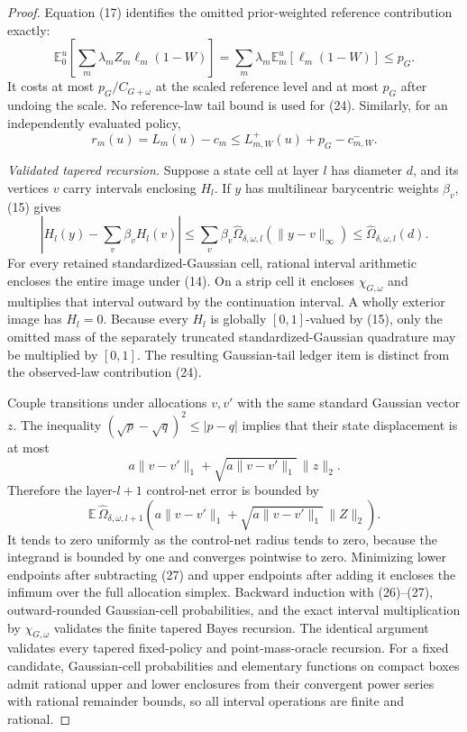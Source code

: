 \documentclass{article}
\begin{document}
\begin{proof}
Equation (17) identifies the omitted prior-weighted reference contribution exactly:
\[
 \mathbb E_0^u\!\left[
 \sum_m\lambda_mZ_m\ell_m(1-W)\right]
 =\sum_m\lambda_m\mathbb E_m^u[\ell_m(1-W)]\leq p_G.
 \tag{24}
\]
It costs at most \(p_G/C_{G+\omega}\) at the scaled reference level and at most \(p_G\) after undoing the scale.  No reference-law tail bound is used for (24).  Similarly, for an independently evaluated policy,
\[
 r_m(u)=L_m(u)-c_m
 \leq L_{m,W}^+(u)+p_G-c_{m,W}^-.
 \tag{25}
\]

\emph{Validated tapered recursion.}
Suppose a state cell at layer \(l\) has diameter \(d\), and its vertices \(v\) carry intervals enclosing \(H_l\).  If \(y\) has multilinear barycentric weights \(\beta_v\), (15) gives
\[
 \left|H_l(y)-\sum_v\beta_vH_l(v)\right|
 \leq\sum_v\beta_v\widehat\Omega_{\delta,\omega,l}(\|y-v\|_\infty)
 \leq\widehat\Omega_{\delta,\omega,l}(d).
 \tag{26}
\]
For every retained standardized-Gaussian cell, rational interval arithmetic encloses the entire image under (14).  On a strip cell it encloses \(\chi_{G,\omega}\) and multiplies that interval outward by the continuation interval.  A wholly exterior image has \(H_l=0\).  Because every \(H_l\) is globally \([0,1]\)-valued by (15), only the omitted mass of the separately truncated standardized-Gaussian quadrature may be multiplied by \([0,1]\).  The resulting Gaussian-tail ledger item is distinct from the observed-law contribution (24).

Couple transitions under allocations \(v,v'\) with the same standard Gaussian vector \(z\).  The inequality \((\sqrt p-\sqrt q)^2\leq|p-q|\) implies that their state displacement is at most
\[
 a\|v-v'\|_1+\sqrt{a\|v-v'\|_1}\,\|z\|_2.
\]
Therefore the layer-\(l+1\) control-net error is bounded by
\[
 \mathbb E\,\widehat\Omega_{\delta,\omega,l+1}\!\left(
 a\|v-v'\|_1+\sqrt{a\|v-v'\|_1}\,\|Z\|_2\right).
 \tag{27}
\]
It tends to zero uniformly as the control-net radius tends to zero, because the integrand is bounded by one and converges pointwise to zero.  Minimizing lower endpoints after subtracting (27) and upper endpoints after adding it encloses the infimum over the full allocation simplex.  Backward induction with (26)--(27), outward-rounded Gaussian-cell probabilities, and the exact interval multiplication by \(\chi_{G,\omega}\) validates the finite tapered Bayes recursion.  The identical argument validates every tapered fixed-policy and point-mass-oracle recursion.  For a fixed candidate, Gaussian-cell probabilities and elementary functions on compact boxes admit rational upper and lower enclosures from their convergent power series with rational remainder bounds, so all interval operations are finite and rational.


\end{proof}
\end{document}
